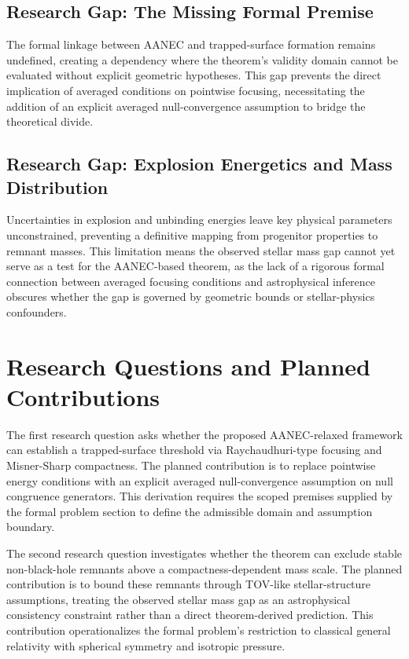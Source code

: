 \documentclass[conference]{IEEEtran}
\begin{document}
\subsection{Research Gap: The Missing Formal Premise}
The formal linkage between AANEC and trapped-surface formation remains undefined, creating a dependency where the theorem's validity domain cannot be evaluated without explicit geometric hypotheses. This gap prevents the direct implication of averaged conditions on pointwise focusing, necessitating the addition of an explicit averaged null-convergence assumption to bridge the theoretical divide.

\subsection{Research Gap: Explosion Energetics and Mass Distribution}
Uncertainties in explosion and unbinding energies leave key physical parameters unconstrained, preventing a definitive mapping from progenitor properties to remnant masses. This limitation means the observed stellar mass gap cannot yet serve as a test for the AANEC-based theorem, as the lack of a rigorous formal connection between averaged focusing conditions and astrophysical inference obscures whether the gap is governed by geometric bounds or stellar-physics confounders.

\section{Research Questions and Planned Contributions}
The first research question asks whether the proposed AANEC-relaxed framework can establish a trapped-surface threshold via Raychaudhuri-type focusing and Misner-Sharp compactness. The planned contribution is to replace pointwise energy conditions with an explicit averaged null-convergence assumption on null congruence generators. This derivation requires the scoped premises supplied by the formal problem section to define the admissible domain and assumption boundary.

The second research question investigates whether the theorem can exclude stable non-black-hole remnants above a compactness-dependent mass scale. The planned contribution is to bound these remnants through TOV-like stellar-structure assumptions, treating the observed stellar mass gap as an astrophysical consistency constraint rather than a direct theorem-derived prediction. This contribution operationalizes the formal problem's restriction to classical general relativity with spherical symmetry and isotropic pressure.
\end{document}
